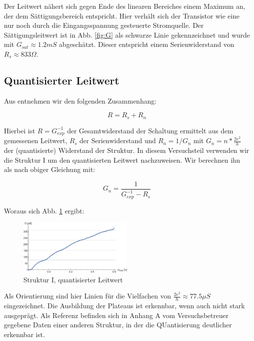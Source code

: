 \documentclass[aps,twocolumn,secnumarabic,nobalancelastpage,amsmath,amssymb,
nofootinbib,superscriptaddress]{revtex4-1}
\begin{document}
Der Leitwert nähert sich gegen Ende des linearen
Bereiches einem Maximum an, der dem Sättigungsbereich entspricht. Hier verhält
sich der Transistor wie eine nur noch durch die Eingangsspannung gesteuerte
Stromquelle. Der Sättigungsleitwert ist in Abb. \ref{fig:G} als schwarze Linie
gekennzeichnet und wurde mit $G_{sat} \approx 1.2 mS$ abgeschätzt. Dieser
entspricht einem Serienwiderstand von $R_s \approx 833 \Omega$.


\subsection{Quantisierter Leitwert}
Aus \cite{skript11} entnehmen wir den folgenden Zusammenhang:

  \begin{equation}
    R = R_s + R_n
  \end{equation}

Hierbei ist $R = G_{exp}^{-1}$ der Gesamtwiderstand der Schaltung ermittelt aus
dem gemessenen Leitwert, $R_s$ der Serienwiderstand und $R_n = 1/G_n$ mit
$G_n = n*\frac{2e^2}{h} $ der (quantisierte) Widerstand der Struktur. In diesem
Versuchsteil verwenden wir die Struktur I um den quantisierten Leitwert nachzuweisen.
Wir berechnen ihn als nach obiger Gleichung mit:

  \begin{equation}
    G_n = \frac{1}{G_{exp}^{-1}-R_s}
  \end{equation}

Woraus sich Abb. \ref{fig:I} ergibt:

\begin{figure}[h]
  \centering
  \includegraphics[width=0.5\textwidth]{Berechnung-Bilder/j.eps}
  \caption{Struktur I, quantisierter Leitwert}
  \label{fig:I}
\end{figure}

Als Orientierung sind hier Linien für die Vielfachen von $\frac{2e^2}{h} \approx 77.5 \mu S$
eingezeichnet. Die Ausbildung der Plateaus ist erkennbar, wenn auch nicht stark
ausgeprägt. Als Referenz befinden sich in Anhang A vom Versuchsbetreuer gegebene
Daten einer anderen Struktur, in der die QUantisierung deutlicher erkennbar ist.
\end{document}

